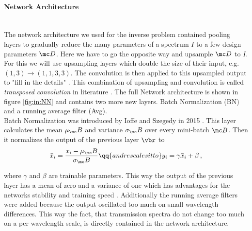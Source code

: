 \paragraph{Network Architecture}~\\
The network architecture we used for the inverse problem contained pooling layers to gradually reduce the many parameters of a spectrum $I$ to a few design parameters $\mc D$. Here we have to go the opposite way and upsample $\mc D$ to $I$. For this we will use upsampling layers which double the size of their input, e.g. $(1,3) \rightarrow (1,1,3,3)$. The convolution is then applied to this upsampled output to "fill in the details" . This combination of upsampling and convolution is called \textit{transposed convolution} in literature . The full Network architecture is shown in figure \ref{fig:in:NN} and contains two more new layers. Batch Normalization (BN) and a running average filter (Avg).
\\

\indent
Batch Normalization was introduced by Ioffe and Szegedy in 2015 \cite{Ioffe2015}. This layer calculates the mean $\mu_\mc B$ and variance $\sigma_\mc B$ over every \hyperref[hyp:minibatch]{mini-batch} $\mc B$. Then it normalizes the output of the previous layer $\vb x$ to 
\begin{equation}
    \bar x_i = \frac{x_i - \mu_\mc B}{\sigma_\mc B}
    \qq{and rescales it to}
    y_i = \gamma \bar x_i + \beta \,,
\end{equation}

where $\gamma$ and $\beta$ are trainable parameters. This way the output of the previous layer has a mean of zero and a variance of one which has advantages for the networks stability and training speed .
Additionally the running average filters were added because the output oscillated too much on small wavelength differences.
This way the fact, that transmission spectra do not change too much on a per wavelength scale, is directly contained in the network architecture. 
\\

